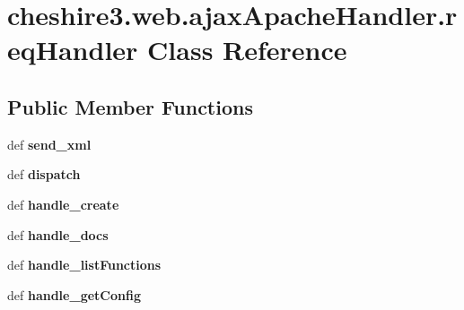 \hypertarget{classcheshire3_1_1web_1_1ajax_apache_handler_1_1req_handler}{\section{cheshire3.\-web.\-ajax\-Apache\-Handler.\-req\-Handler Class Reference}
\label{classcheshire3_1_1web_1_1ajax_apache_handler_1_1req_handler}
}
\subsection*{Public Member Functions}
\begin{DoxyCompactItemize}
\item 
\hypertarget{classcheshire3_1_1web_1_1ajax_apache_handler_1_1req_handler_a26428eb7610a8acd96597c8d1c84eed4}{def {\bfseries send\-\_\-xml}}\label{classcheshire3_1_1web_1_1ajax_apache_handler_1_1req_handler_a26428eb7610a8acd96597c8d1c84eed4}

\item 
\hypertarget{classcheshire3_1_1web_1_1ajax_apache_handler_1_1req_handler_a0225e1f74db7efc12fff350c6e00e68d}{def {\bfseries dispatch}}\label{classcheshire3_1_1web_1_1ajax_apache_handler_1_1req_handler_a0225e1f74db7efc12fff350c6e00e68d}

\item 
\hypertarget{classcheshire3_1_1web_1_1ajax_apache_handler_1_1req_handler_a17e79f0c80c4592df07e72aa40e47f05}{def {\bfseries handle\-\_\-create}}\label{classcheshire3_1_1web_1_1ajax_apache_handler_1_1req_handler_a17e79f0c80c4592df07e72aa40e47f05}

\item 
\hypertarget{classcheshire3_1_1web_1_1ajax_apache_handler_1_1req_handler_ad253d713305abc57da7fa2fcd1fcffee}{def {\bfseries handle\-\_\-docs}}\label{classcheshire3_1_1web_1_1ajax_apache_handler_1_1req_handler_ad253d713305abc57da7fa2fcd1fcffee}

\item 
\hypertarget{classcheshire3_1_1web_1_1ajax_apache_handler_1_1req_handler_ae53ebb9b86cf680d051a5eab8b046f0c}{def {\bfseries handle\-\_\-list\-Functions}}\label{classcheshire3_1_1web_1_1ajax_apache_handler_1_1req_handler_ae53ebb9b86cf680d051a5eab8b046f0c}

\item 
\hypertarget{classcheshire3_1_1web_1_1ajax_apache_handler_1_1req_handler_a49238231841e5ca799e4a72a8286b034}{def {\bfseries handle\-\_\-get\-Config}}\label{classcheshire3_1_1web_1_1ajax_apache_handler_1_1req_handler_a49238231841e5ca799e4a72a8286b034}


\end{DoxyCompactItemize}
